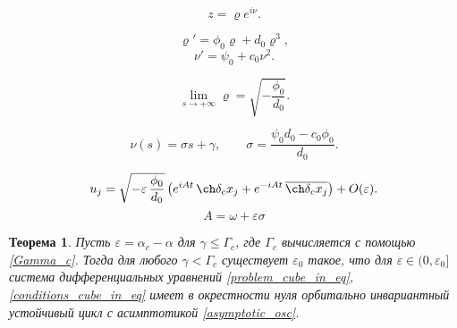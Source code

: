 \documentclass[fullscreen=true, unicode, bookmarks=false]{beamer}
\newtheorem{rustheorem}{Теорема }
\begin{document}
\begin{frame}

$$ z=\varrho e^{i \nu}. $$

\vfill

$$
\varrho' = \phi_0 \varrho + d_0 \varrho^3,
$$
$$
\nu' = \psi_0 + c_0 \nu^2.
$$

\vfill

$$ \lim_{s \rightarrow +\infty} \varrho = \sqrt{-\dfrac{\phi_0}{d_0}}. $$

\vfill

$$
\nu(s) = \sigma s + \gamma, \qquad \sigma = \frac{\psi_0 d_0 - c_0 \phi_0}{d_0}.
$$

\vfill

\begin{equation}\label{asymptotic_osc}
    u_j = \sqrt{-\varepsilon\, \dfrac{\phi_0}{d_0}} \left( e^{i A t} \, \ch \delta_c x_j + e^{-i A t} \, \overline{\ch \delta_c x_j}  \right) + O(\varepsilon).
\end{equation}
$$ A = \omega + \varepsilon \sigma $$

\end{frame}

\begin{frame}

\begin{rustheorem}
Пусть $ \varepsilon = \alpha_c - \alpha $ для $ \gamma \leqslant \Gamma_c $, где $ \Gamma_c $ вычисляется с помощью \eqref{Gamma_c}. Тогда для любого $ \gamma < \Gamma_c $ существует $ \varepsilon_0 $ такое, что для $ \varepsilon \in (0, \varepsilon_0] $ система дифференциальных уравнений \eqref{problem_cube_in_eq}, \eqref{conditions_cube_in_eq} имеет в окрестности нуля орбитально инвариантный устойчивый цикл с асимптотикой \eqref{asymptotic_osc}.
\end{rustheorem}

\end{frame}
\end{document}

